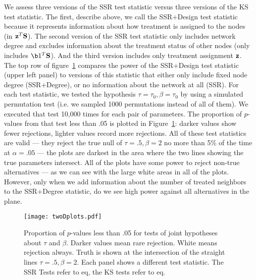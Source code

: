 We assess three versions of the SSR test statistic versus three versions of
the KS test statistic. The first, describe above, we call the SSR+Design test
statistic because it represents information about how treatment is assigned to
the nodes (in $\mathbf{z}^T \mathbf{S}$). The second version of the SSR test statistic only
includes network degree and excludes information about the treatment status of
other nodes (only includes $\b1^T \bS$). And the third version includes only
treatment assignment $\mathbf{z}$. The top row of figure~\ref{fig:twoD} compares the
power of the SSR+Design test statistic (upper left panel) to versions of this
statistic that either only include fixed node degree (SSR+Degree), or no
information about the network at all (SSR). For each test statistic, we tested
the hypothesis $\tau=\tau_0,\beta=\tau_0$ by using a simulated permutation
test (i.e. we sampled 1000 permutations instead of all of them). We executed that
test 10,000 times for each pair of parameters.  The proportion of $p$-values
from that test less than .05 is plotted in Figure~\ref{fig:twoD}: darker
values show fewer rejections, lighter values record more rejections.  All of
these test statistics are valid --- they reject the true null of
$\tau=.5,\beta=2$ no more than 5\% of the time at $\alpha=.05$ --- the plots
are darkest in the area where the two lines showing the true parameters
intersect. All of the plots have some power to reject non-true alternatives
--- as we can see with the large white areas in all of the plots. However,
only when we add information about the number of treated neighbors to the
SSR+Degree statistic, do we see high power against all alternatives in the
plane.


\begin{figure}[h!]
\centering
\texttt{[image: twoDplots.pdf]}
\caption{Proportion of $p$-values less than .05 for tests of joint hypotheses
about $\tau$ and $\beta$. Darker values mean rare rejection. White means
rejection always. Truth is shown at the intersection of the straight
lines  $\tau=.5, \beta=2$. Each panel shows a different test statistic. The
SSR Tests refer to eq, the KS tests refer to eq.  }\label{fig:twoD}
\end{figure}

